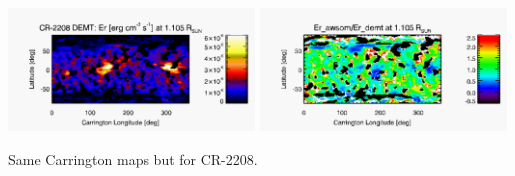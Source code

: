 \documentclass[paperwidth=100cm,paperheight=120cm]{baposter}
\begin{document}
\begin{poster}
{{\begin{center}
{\includegraphics[width=0.49\textwidth]{map_Er_CR2208_DEMT-EUVI_behind_H1-L502020_r3d_1105_Rsun.pdf}}
{\includegraphics[width=0.49\textwidth]{map_ratio_qrad_awsom_2208_185-Er_CR2208_DEMT-EUVI_behind_H1-L502020_r3d_1105_Rsun.pdf}}\\
\end{center}
Same Carrington maps but for CR-2208.
}
}


\end{poster}
\end{document}

